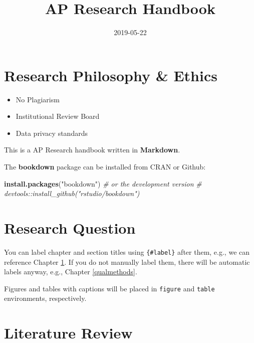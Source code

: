 \documentclass[]{book}
\title{AP Research Handbook}
\author{}
\date{2019-05-22}
\newenvironment{Shaded}{\begin{snugshade}}{\end{snugshade}}
\newcommand{\CommentTok}[1]{\textcolor[rgb]{0.56,0.35,0.01}{\textit{#1}}}
\newcommand{\KeywordTok}[1]{\textcolor[rgb]{0.13,0.29,0.53}{\textbf{#1}}}
\newcommand{\NormalTok}[1]{#1}
\newcommand{\StringTok}[1]{\textcolor[rgb]{0.31,0.60,0.02}{#1}}
\providecommand{\tightlist}{%
  \setlength{\itemsep}{0pt}\setlength{\parskip}{0pt}}
\begin{document}
\maketitle

{
\setcounter{tocdepth}{1}
\tableofcontents
}
\hypertarget{research-philosophy-ethics}{%
\chapter*{Research Philosophy \& Ethics}\label{research-philosophy-ethics}}

\begin{itemize}
\tightlist
\item
  No Plagiarism
\item
  Institutional Review Board
\item
  Data privacy standards
\end{itemize}

This is a AP Research handbook written in \textbf{Markdown}.

The \textbf{bookdown} package can be installed from CRAN or Github:

\begin{Shaded}
\begin{Highlighting}[]
\KeywordTok{install.packages}\NormalTok{(}\StringTok{"bookdown"}\NormalTok{)}
\CommentTok{# or the development version}
\CommentTok{# devtools::install_github("rstudio/bookdown")}
\end{Highlighting}
\end{Shaded}

\hypertarget{intro}{%
\chapter{Research Question}\label{intro}}

You can label chapter and section titles using \texttt{\{\#label\}} after them, e.g., we can reference Chapter \ref{intro}. If you do not manually label them, there will be automatic labels anyway, e.g., Chapter \ref{qualmethods}.

Figures and tables with captions will be placed in \texttt{figure} and \texttt{table} environments, respectively.

\hypertarget{literature-review}{%
\chapter{Literature Review}\label{literature-review}}
\end{document}
